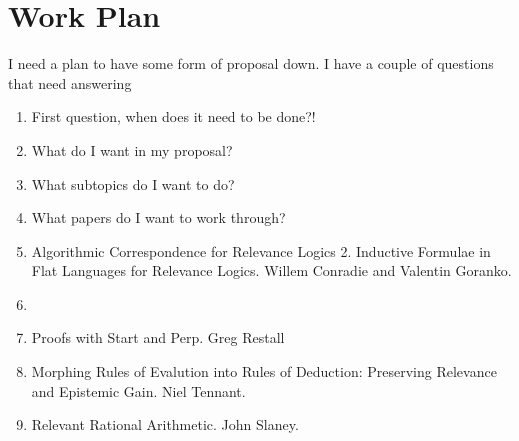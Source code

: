 \chapter{Work Plan}

\par I need a plan to have some form of proposal down. I have a couple of questions that need answering
\begin{enumerate}
    \item First question, when does it need to be done?! 
    \item What do I want in my proposal? 
    \item What subtopics do I want to do?
    \item What papers do I want to work through? 
    \item Algorithmic Correspondence for Relevance Logics 2. Inductive Formulae in Flat Languages for Relevance Logics. Willem Conradie and Valentin Goranko.
    \item {}
    \item Proofs with Start and Perp. Greg Restall
    \item Morphing Rules of Evalution into Rules of Deduction: Preserving Relevance and Epistemic Gain. Niel Tennant.
    \item Relevant Rational Arithmetic. John Slaney.
\end{enumerate}
